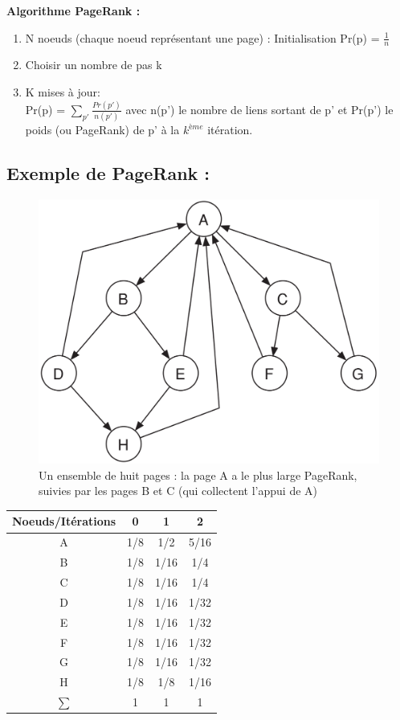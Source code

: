 \textbf{ Algorithme PageRank :}
\begin{enumerate}
	\item N noeuds (chaque noeud représentant une page) :
	Initialisation Pr(p) =  $\frac{1}{n}$
	\item Choisir un nombre de pas k
	\item K mises à jour:\\
	Pr(p) = $ \sum_ {p'}\frac{Pr(p')}{n(p')} $ avec n(p') le nombre de liens sortant de p' et Pr(p') le poids (ou PageRank) de p' à la $k^{ème}$ itération.
\end{enumerate}
\subsection*{Exemple de PageRank :}

\begin{figure}[!ht]
\centering
 \includegraphics[width=0.5\linewidth]{images/24_PageRank.png}
 \caption{Un ensemble de huit pages : la page A a le plus large
     PageRank, suivies par les pages B et C (qui collectent l'appui de
 A)}
 \label{graphPageRank}
\end{figure}

 
 	\begin{tabular}{|c| c |c |c |}
		\hline
		Noeuds/Itérations & 0 & 1 & 2 \\
		\hline
		A & 1/8 & 1/2 & 5/16 \\
		B & 1/8 & 1/16 &  1/4   \\
		C & 1/8 & 1/16 & 1/4    \\
		D & 1/8 & 1/16 & 1/32  \\
		E & 1/8 & 1/16 &  1/32   \\
		F & 1/8 & 1/16 & 1/32    \\
		G & 1/8 & 1/16 & 1/32    \\
		H & 1/8 & 1/8 &  1/16   \\
		\hline
		$\sum $ & 1 & 1 & 1 \\
		\hline
	\end{tabular}

